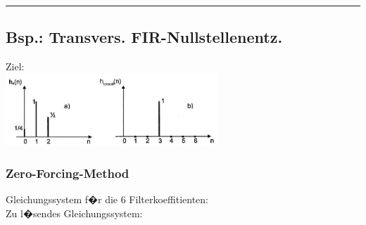 \vspace{0.25cm}
		
\hrule

\vspace{0.25cm}

    \begin{minipage}{9cm}
		\subsection{Bsp.: Transvers. FIR-Nullstellenentz.}
		Ziel:\\
		\includegraphics[width=8cm]{./Content/Equalizer/Equalizer01.JPG}
        
        \subsubsection{Zero-Forcing-Method}
        Gleichungssystem f�r die 6 Filterkoeffitienten:\\
        Zu l�sendes Gleichungssystem:\\
				\footnotesize
				\vspace{0.25cm}
				

\end{minipage}
